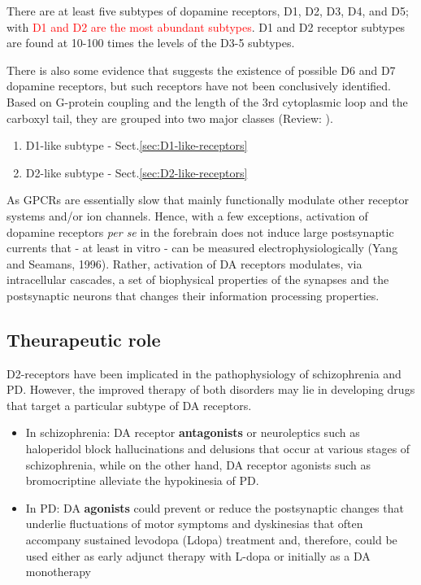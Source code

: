 There are at least five subtypes of dopamine receptors, D1, D2, D3, D4, and D5;
with \textcolor{red}{D1 and D2 are the most abundant subtypes}.
D1 and D2 receptor subtypes are found at 10-100 times the levels of the D3-5
subtypes. 

There is also some evidence that suggests the existence of possible D6 and D7
dopamine receptors, but such receptors have not been conclusively identified.
Based on G-protein coupling and the length of the 3rd cytoplasmic loop
and the carboxyl tail, they are grouped into two major classes (Review:
\citep{emilien1999}).
\begin{enumerate}
  \item D1-like subtype - Sect.\ref{sec:D1-like-receptors}
  
  \item D2-like subtype - Sect.\ref{sec:D2-like-receptors}
\end{enumerate}

\begin{mdframed}

As GPCRs are essentially slow that mainly functionally modulate other receptor
systems and/or ion channels.  Hence, with a few exceptions, activation of
dopamine receptors {\it per se} in the forebrain does not induce large
postsynaptic currents that - at least in vitro - can be measured
electrophysiologically (Yang and Seamans, 1996). Rather, activation of DA
receptors modulates, via intracellular cascades, a set of biophysical properties
of the synapses and the postsynaptic neurons that changes their information
processing properties. 
\end{mdframed}





% 

\subsection{Theurapeutic role}

D2-receptors have been implicated in the pathophysiology of schizophrenia and
PD.  However, the improved therapy of both disorders may lie in developing drugs
that target a particular subtype of DA receptors.
\begin{itemize}
  \item  In schizophrenia: DA receptor {\bf antagonists} or neuroleptics
such as haloperidol block hallucinations and delusions
that occur at various stages of schizophrenia, while on the
other hand, DA receptor agonists such as bromocriptine alleviate
the hypokinesia of PD. 
  
  \item In PD: DA {\bf agonists} could prevent or reduce the postsynaptic
  changes that underlie fluctuations of motor symptoms and dyskinesias that
  often accompany sustained levodopa (Ldopa)  treatment and, therefore, could be
  used either as early  adjunct therapy with L-dopa or initially as a DA
  monotherapy 
\end{itemize}

